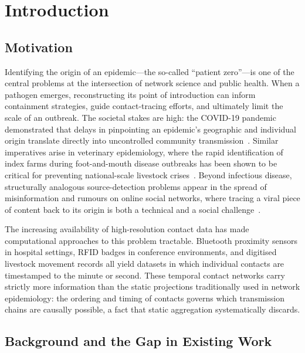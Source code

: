 \chapter{Introduction}
\label{c:introduction}

\section{Motivation}
\label{sec:intro-motivation}

Identifying the origin of an epidemic---the so-called ``patient zero''---is one of the central problems at the intersection of network science and public health. When a pathogen emerges, reconstructing its point of introduction can inform containment strategies, guide contact-tracing efforts, and ultimately limit the scale of an outbreak. The societal stakes are high: the COVID-19 pandemic demonstrated that delays in pinpointing an epidemic's geographic and individual origin translate directly into uncontrolled community transmission~\cite{WHO2020}. Similar imperatives arise in veterinary epidemiology, where the rapid identification of index farms during foot-and-mouth disease outbreaks has been shown to be critical for preventing national-scale livestock crises~\cite{Keeling2001}. Beyond infectious disease, structurally analogous source-detection problems appear in the spread of misinformation and rumours on online social networks, where tracing a viral piece of content back to its origin is both a technical and a social challenge~\cite{Shah2011}.

The increasing availability of high-resolution contact data has made computational approaches to this problem tractable. Bluetooth proximity sensors in hospital settings, RFID badges in conference environments, and digitised livestock movement records all yield datasets in which individual contacts are timestamped to the minute or second. These temporal contact networks carry strictly more information than the static projections traditionally used in network epidemiology: the ordering and timing of contacts governs which transmission chains are causally possible, a fact that static aggregation systematically discards.

\section{Background and the Gap in Existing Work}
\label{sec:intro-background}

